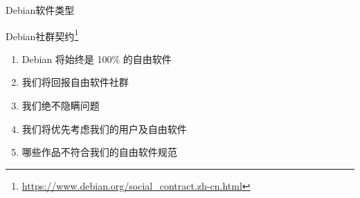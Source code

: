\documentclass{beamer}
\begin{document}
\begin{frame}[t]{Debian软件类型}
    \begin{block}{Debian社群契约\footnote{\url{https://www.debian.org/social_contract.zh-cn.html}}}
        \begin{enumerate}
            \item Debian 将始终是 100\% 的自由软件
            \item 我们将回报自由软件社群
            \item 我们绝不隐瞒问题
            \item 我们将优先考虑我们的用户及自由软件
            \item 哪些作品不符合我们的自由软件规范
        \end{enumerate}
	\end{block}
\end{frame}
\end{document}

